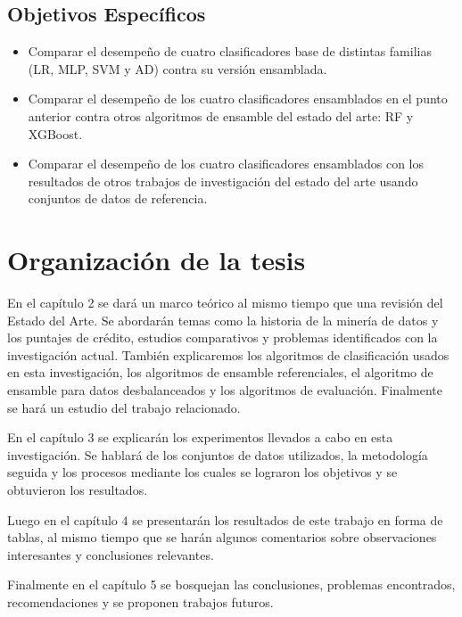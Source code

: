 \subsection{Objetivos Específicos}

\begin{itemize}
	\item Comparar el desempeño de cuatro clasificadores base de distintas familias (\ac{LR}, \ac{MLP}, \ac{SVM} y \ac{AD}) contra su versión ensamblada.

	\item Comparar el desempeño de los cuatro clasificadores ensamblados en el punto anterior contra otros algoritmos de ensamble del estado del arte: \ac{RF} y \ac{XGBoost}.

	\item Comparar el desempeño de los cuatro clasificadores ensamblados con los resultados de otros trabajos de investigación del estado del arte usando conjuntos de datos de referencia.
\end{itemize}

\section{Organización de la tesis}

En el capítulo 2 se dará un marco teórico al mismo tiempo que una revisión del Estado del Arte. Se abordarán temas como la historia de la minería de datos y los puntajes de crédito, estudios comparativos y problemas identificados con la investigación actual. También explicaremos los algoritmos de clasificación usados en esta investigación, los algoritmos de ensamble referenciales, el algoritmo de ensamble para datos desbalanceados y los algoritmos de evaluación. Finalmente se hará un estudio del trabajo relacionado.

En el capítulo 3 se explicarán los experimentos llevados a cabo en esta investigación. Se hablará de los conjuntos de datos utilizados, la metodología seguida y los procesos mediante los cuales se lograron los objetivos y se obtuvieron los resultados.

Luego en el capítulo 4 se presentarán los resultados de este trabajo en forma de tablas, al mismo tiempo que se harán algunos comentarios sobre observaciones interesantes y conclusiones relevantes.

Finalmente en el capítulo 5 se bosquejan las conclusiones, problemas encontrados, recomendaciones y se proponen trabajos futuros.


